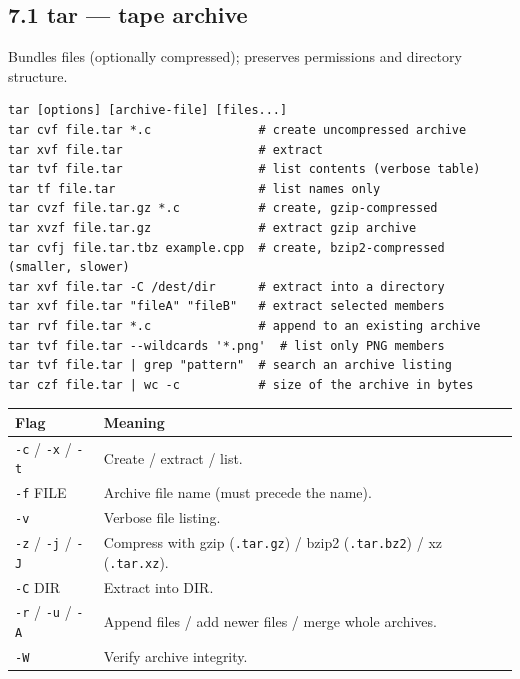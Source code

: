 \documentclass[11pt,a4paper]{article}
\newcommand{\cmd}[1]{\texttt{#1}}
\begin{document}
\subsection{7.1 tar --- tape archive}
Bundles files (optionally compressed); preserves permissions and directory structure.
\begin{lstlisting}
tar [options] [archive-file] [files...]
tar cvf file.tar *.c               # create uncompressed archive
tar xvf file.tar                   # extract
tar tvf file.tar                   # list contents (verbose table)
tar tf file.tar                    # list names only
tar cvzf file.tar.gz *.c           # create, gzip-compressed
tar xvzf file.tar.gz               # extract gzip archive
tar cvfj file.tar.tbz example.cpp  # create, bzip2-compressed (smaller, slower)
tar xvf file.tar -C /dest/dir      # extract into a directory
tar xvf file.tar "fileA" "fileB"   # extract selected members
tar rvf file.tar *.c               # append to an existing archive
tar tvf file.tar --wildcards '*.png'  # list only PNG members
tar tvf file.tar | grep "pattern"  # search an archive listing
tar czf file.tar | wc -c           # size of the archive in bytes
\end{lstlisting}
\begin{center}
\small
\begin{tabularx}{\textwidth}{lX}
\toprule
Flag & Meaning \\
\midrule
\cmd{-c} / \cmd{-x} / \cmd{-t} & Create / extract / list. \\
\cmd{-f} FILE & Archive file name (must precede the name). \\
\cmd{-v} & Verbose file listing. \\
\cmd{-z} / \cmd{-j} / \cmd{-J} & Compress with gzip (\cmd{.tar.gz}) / bzip2 (\cmd{.tar.bz2}) / xz (\cmd{.tar.xz}). \\
\cmd{-C} DIR & Extract into DIR. \\
\cmd{-r} / \cmd{-u} / \cmd{-A} & Append files / add newer files / merge whole archives. \\
\cmd{-W} & Verify archive integrity. \\
\bottomrule
\end{tabularx}
\end{center}
\end{document}
